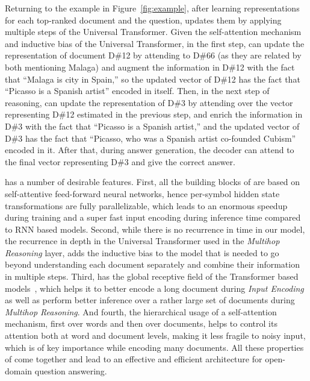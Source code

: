 Returning to the example in Figure~\ref{fig:example}, after learning representations for each top-ranked document and the question, \tracrnet updates them by applying multiple steps of the Universal Transformer. 
Given the self-attention mechanism and inductive bias of the Universal Transformer, in the first step, \tracrnet can update the representation of document D\#12 by attending to D\#66 (as they are related by both mentioning Malaga) and augment the information in D\#12 with the fact that ``Malaga is city in Spain,'' so the updated vector of D\#12 has the fact that ``Picasso is a Spanish artist'' encoded in itself. 
Then, in the next step of reasoning, \tracrnet can update the representation of D\#3 by attending over the vector representing D\#12 estimated in the previous step, and enrich the information in D\#3 with the fact that ``Picasso is a Spanish artist,'' and the updated vector of D\#3 has the fact that ``Picasso, who was a Spanish artist co-founded Cubism'' encoded in it. 
After that, during answer generation, the decoder can attend to the final vector representing D\#3 and give the correct answer.

\tracrnet has a number of desirable features.
%
First, all the building blocks of \tracrnet are based on self-attentive feed-forward neural networks, hence per-symbol hidden state transformations are fully parallelizable, which leads to an enormous speedup during training and a super fast input encoding during inference time compared to RNN based models. 
Second, while there is no recurrence in time in our model, the recurrence in depth in the Universal Transformer used in the \emph{Multihop Reasoning} layer, adds the inductive bias to the model that is needed to go beyond understanding each document separately and combine their information in multiple steps.
Third, \tracrnet has the global receptive field of the Transformer based models~\citep{vaswani2017attention,dehghani2018universal}, which helps it to better encode a long document during \emph{Input Encoding} as well as perform better inference over a rather large set of documents during \emph{Multihop Reasoning}.
And fourth, the hierarchical usage of a self-attention mechanism, first over words and then over documents, helps \tracrnet to control its attention both at word and document levels, making it less fragile to noisy input, which is of key importance while encoding many documents.
%
All these properties of \tracrnet come together and lead to an effective and efficient architecture for open-domain question answering. 

